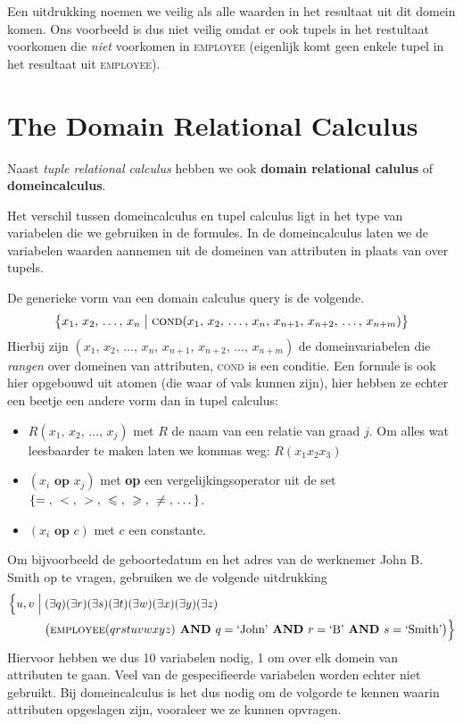 Een uitdrukking noemen we veilig als alle waarden in het resultaat uit dit domein komen. Ons voorbeeld is dus niet veilig omdat er ook tupels in het restultaat voorkomen die \textit{niet} voorkomen in \textsc{employee} (eigenlijk komt geen enkele tupel in het resultaat uit \textsc{employee}).



\newpage
\section{The Domain Relational Calculus}
Naast \textit{tuple relational calculus} hebben we ook \textbf{domain relational calulus} of \textbf{domeincalculus}.

Het verschil tussen domeincalculus en tupel calculus ligt in het type van variabelen die we gebruiken in de formules. In de domeincalculus laten we de variabelen waarden aannemen uit de domeinen van attributen in plaats van over tupels.

De generieke vorm van een domain calculus query is de volgende.
\vspace{-2mm}
\[ \big\{ x_1,\, x_2,\, \dots,\, x_n \bigm| \textsc{cond}(x_1,\, x_2,\, \dots,\, x_n,\, x_{n+1},\, x_{n+2},\, \dots,\, x_{n+m}) \big\} \]
Hierbij zijn $(x_1,\, x_2,\, \dots,\, x_n,\, x_{n+1},\, x_{n+2},\, \dots,\, x_{n+m})$ de domeinvariabelen die \textit{rangen} over domeinen van attributen, \textsc{cond} is een conditie. Een formule is ook hier opgebouwd uit atomen (die waar of vals kunnen zijn), hier hebben ze echter een beetje een andere vorm dan in tupel calculus:
\begin{itemize}
\item $R(x_1,\, x_2,\, \dots,\, x_j)$ met $R$ de naam van een relatie van graad $j$. Om alles wat leesbaarder te maken laten we kommas weg: $R(x_1 x_2 x_3)$
\item $(x_i \textbf{ op } x_j)$ met \textbf{op} een vergelijkingsoperator uit de set $\{=  \text{, } < \text{, } > \text{, } \leqslant \text{, } \geqslant \text{, } \neq \text{, \dots} \}$.
\item $(x_i \textbf{ op } c)$ met $c$ een constante.
\end{itemize} 
Om bijvoorbeeld de geboortedatum en het adres van de werknemer John B. Smith op te vragen, gebruiken we de volgende uitdrukking
\vspace{-2mm}
\begin{align*}
\Big\{ u,v \Bigm| \; &(\exists q)(\exists r)(\exists s)(\exists t)(\exists w)(\exists x)(\exists y)(\exists z) \\
&\big( \textsc{employee}(qrstuvwxyz) \textbf{ AND } q=\text{`John'} \textbf{ AND } r=\text{`B'} \textbf{ AND } s=\text{`Smith'} \big) \Big\}
\end{align*}
Hiervoor hebben we dus 10 variabelen nodig, 1 om over elk domein van attributen te gaan. Veel van de gespecifieerde variabelen worden echter niet gebruikt. Bij domeincalculus is het dus nodig om de volgorde te kennen waarin attributen opgeslagen zijn, vooraleer we ze kunnen opvragen.

